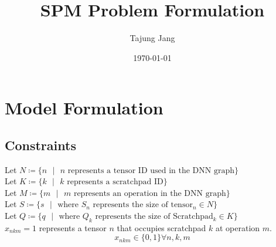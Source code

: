 \documentclass{article}
\title{SPM Problem Formulation} \author{Tajung Jang}
\date\today
\begin{document}
\maketitle %

\section{Model Formulation}
\subsection{Constraints}
Let $N \coloneqq \{ n \text{ }  | \text{ } n   \text{ represents a tensor ID used in the DNN graph}\}$\\
Let $K \coloneqq \{ k \text{ }  | \text{ } k   \text{ represents a scratchpad ID}\}$\\
Let $M \coloneqq \{ m \text{ }  | \text{ } m   \text{ represents an operation in the DNN graph}\}$\\
Let $S \coloneqq \{ s \text{ }| \text{ } \text{where } S_n \text{ represents the size of tensor$_n \in N$}\}$\\
Let $Q \coloneqq \{ q \text{ }| \text{ } \text{where } Q_k \text{ represents the size of Scratchpad$_k \in K$}\}$\\

$x_{nkm} = 1$ represents a tensor $n$ that occupies scratchpad $k$ at operation $m$.\\

\[
x_{nkm} \in \{0, 1\} \forall n,k,m
\]
\end{document}
